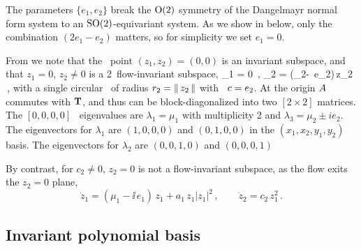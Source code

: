 \documentclass[aip,cha,
reprint,
secnumarabic,
nofootinbib, tightenlines,
nobibnotes, showkeys, showpacs,
groupedaddress,
]{revtex4-1}
\begin{document}
The parameters $\{e_1,e_2\}$ break the $\textrm{O}(2)$ symmetry of the
Dangelmayr normal form system to an $\textrm{SO}(2)$-equivariant
system. As we show in  below, only the combination
$(2e_1-e_2)$ matters, so for simplicity we set $e_1=0$. 

From  we note that the \eqv\ point \((z_1,z_2)=(0,0)\)
is an invariant subspace, and that $z_1=0$, $z_2 \neq 0$ is a 2\dmn\
flow-invariant subspace,
\beq
  _1 = 0
\,,\qquad
  _2 = (\mu_2-\ii\, e_2)\,{z_2}
\,,
with a single circular \reqv\ of radius $r_2 = \norm{z_2}$ with
\phaseVel\ $\velRel=e_2$.
At the origin $\Mvar$ commutes with $\Lg$, and thus can be block-diagonalized
into two $[2\!\times\!2]$ matrices.
The $[0,0,0,0]$ \eqv\ eigenvalues are $\lambda_1 = \mu_1$ with multiplicity 2 and
             $\lambda_3 = \mu_2 \pm i e_2$. The eigenvectors for
             $\lambda_1$ are $(1,0,0,0)$ and $(0,1,0,0)$ in the
             $(x_1,x_2,y_1,y_2)$ basis.
             The eigenvectors for
             $\lambda_2$ are $(0,0,1,0)$ and $(0,0,0,1)$



By contrast, for $c_2 \neq 0$, $z_2 =0$ is not a flow-invariant subspace,
as the flow exits the $z_2 =0$ plane,
\[
  \dot{z}_1 = (\mu_1-\ii\, e_1)\,z_1+a_1\,z_1|z_1|^2
\,,\qquad
  \dot{z}_2 = c_2\,z_1^2
\,.
\]




\subsection{Invariant polynomial basis}
\label{s:invPol}
\end{document}
